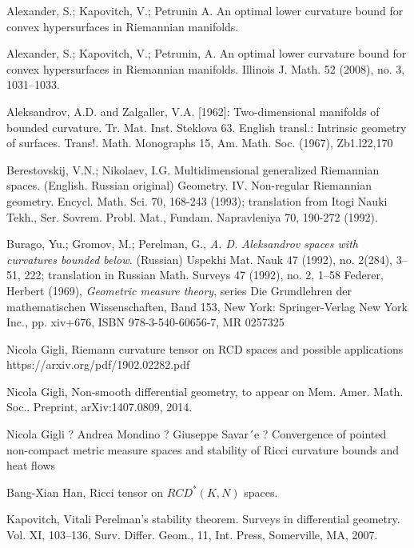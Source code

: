 \begin{thebibliography}{52}

 Alexander, S.; Kapovitch, V.; Petrunin A.
An optimal lower curvature bound for convex hypersurfaces in Riemannian manifolds.


 Alexander, S.; Kapovitch, V.; Petrunin, A.
An optimal lower curvature bound for convex hypersurfaces in Riemannian manifolds.
Illinois J. Math. 52 (2008), no. 3, 1031--1033.

Aleksandrov, A.D. and Zalgaller, V.A. [1962]: Two-dimensional manifolds of bounded curvature.
Tr. Mat. Inst. Steklova 63. English transl.: Intrinsic geometry of surfaces. Trans!. Math. Monographs
15, Am. Math. Soc. (1967), Zb1.l22,170


Berestovskij, V.N.; Nikolaev, I.G.
Multidimensional generalized Riemannian spaces. (English. Russian original)
Geometry. IV. Non-regular Riemannian geometry. Encycl. Math. Sci. 70, 168-243 (1993); translation from Itogi Nauki Tekh., Ser. Sovrem. Probl. Mat., Fundam. Napravleniya 70, 190-272 (1992).


 Burago, Yu.; Gromov, M.; Perelman, G., \textit{A. D. Aleksandrov spaces
with curvatures bounded below.} (Russian)  Uspekhi Mat. Nauk  47  (1992),  no.
2(284), 3--51, 222;   translation in  Russian Math. Surveys  47  (1992),  no. 2, 1--58
Federer, Herbert (1969), \textit{Geometric measure theory}, series Die Grundlehren der mathematischen Wissenschaften, Band 153, New York: Springer-Verlag New York Inc., pp. xiv+676, ISBN 978-3-540-60656-7, MR 0257325

Nicola Gigli,
Riemann curvature tensor on RCD spaces and possible applications https://arxiv.org/pdf/1902.02282.pdf

Nicola Gigli,
Non-smooth differential geometry, to appear on Mem. Amer. Math. Soc..
Preprint, arXiv:1407.0809, 2014.

Nicola Gigli ? Andrea Mondino ? Giuseppe Savar´e ?
Convergence of pointed non-compact metric measure spaces
and stability of Ricci curvature bounds and heat flows



 Bang-Xian Han, 
Ricci tensor on $RCD^*(K, N)$ spaces.

 Kapovitch, Vitali Perelman's stability theorem. Surveys in differential geometry. Vol. XI, 103–136, Surv. Differ. Geom., 11, Int. Press, Somerville, MA, 2007.


\end{thebibliography}
